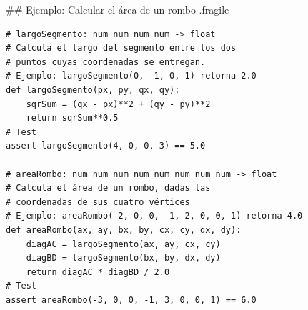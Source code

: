\trmcolumns

## Ejemplo: Calcular el área de un rombo {.fragile}


\begin{lstlisting}[basicstyle=\scriptsize\ttfamily,style=frame01]
# largoSegmento: num num num num -> float
# Calcula el largo del segmento entre los dos
# puntos cuyas coordenadas se entregan.
# Ejemplo: largoSegmento(0, -1, 0, 1) retorna 2.0
def largoSegmento(px, py, qx, qy):
    sqrSum = (qx - px)**2 + (qy - py)**2
    return sqrSum**0.5
# Test
assert largoSegmento(4, 0, 0, 3) == 5.0

# areaRombo: num num num num num num num num -> float
# Calcula el área de un rombo, dadas las
# coordenadas de sus cuatro vértices
# Ejemplo: areaRombo(-2, 0, 0, -1, 2, 0, 0, 1) retorna 4.0
def areaRombo(ax, ay, bx, by, cx, cy, dx, dy):
    diagAC = largoSegmento(ax, ay, cx, cy)
    diagBD = largoSegmento(bx, by, dx, dy)
    return diagAC * diagBD / 2.0
# Test
assert areaRombo(-3, 0, 0, -1, 3, 0, 0, 1) == 6.0
\end{lstlisting}
